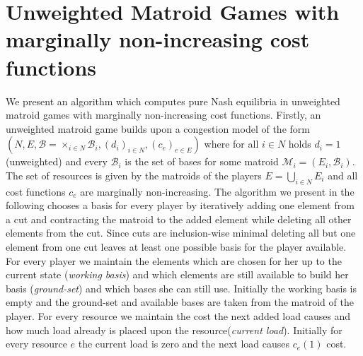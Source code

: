\documentclass{scrartcl}
\theoremstyle{nonumberplain}
\newcommand{\tupel}[1]{\left(#1\right)}
\begin{document}
\section{Unweighted Matroid Games with marginally non-increasing cost
functions}
We present an algorithm which computes pure Nash equilibria in unweighted
matroid games with marginally non-increasing cost functions. Firstly, an
unweighted matroid game builds upon a congestion model of the form
$\tupel{N, E, \mathcal{B} = \times_{i\in N}\mathcal{B}_{i},
(d_{i})_{i\in N}, (c_{e})_{e\in E}}$ where for all $i\in N$ holds $d_{i} = 1$
(unweighted) and every $\mathcal{B}_{i}$ is the set of bases for some matroid
$\mathcal{M}_{i} = \tupel{E_{i}, \mathcal{B}_{i}}$. The set of resources is
given by the matroids of the players $E = \bigcup_{i\in N}E_{i}$ and all cost
functions $c_{e}$ are marginally non-increasing. The algorithm
we present in the following chooses a basis for every player by iteratively
adding one element from a cut and contracting the matroid to the added element
while deleting all other elements from the cut. Since cuts are inclusion-wise
minimal deleting all but one element from one cut leaves at least one possible
basis for the player available. For every player we maintain the elements which
are chosen for her up to the current state (\emph{working basis}) and which
elements are still available to build her basis (\emph{ground-set}) and which
bases she can still use. Initially the working basis is empty and the
ground-set and available bases are taken from the matroid of the player. For
every resource we maintain the cost the next added load causes and how much
load already is placed upon the resource(\emph{current load}). Initially for
every resource $e$ the current load is zero and the next load causes $c_{e}(1)$
cost.

\todos
\end{document}
